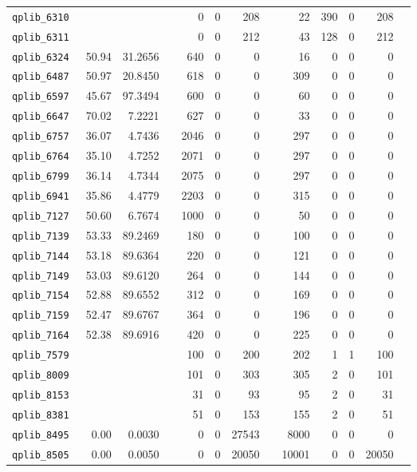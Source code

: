 \begin{longtable}{lrrrrrrrrrrrr}
{\tt 	qplib\_6310	}	&		&		&	&	0	&	0	&	208	&	&	22	&	390	&	0	&	208	\\
{\tt 	qplib\_6311	}	&		&		&	&	0	&	0	&	212	&	&	43	&	128	&	0	&	212	\\
{\tt 	qplib\_6324	}	&	50.94	&	31.2656	&	&	640	&	0	&	0	&	&	16	&	0	&	0	&	0	\\
{\tt 	qplib\_6487	}	&	50.97	&	20.8450	&	&	618	&	0	&	0	&	&	309	&	0	&	0	&	0	\\
{\tt 	qplib\_6597	}	&	45.67	&	97.3494	&	&	600	&	0	&	0	&	&	60	&	0	&	0	&	0	\\
{\tt 	qplib\_6647	}	&	70.02	&	7.2221	&	&	627	&	0	&	0	&	&	33	&	0	&	0	&	0	\\
{\tt 	qplib\_6757	}	&	36.07	&	4.7436	&	&	2046	&	0	&	0	&	&	297	&	0	&	0	&	0	\\
{\tt 	qplib\_6764	}	&	35.10	&	4.7252	&	&	2071	&	0	&	0	&	&	297	&	0	&	0	&	0	\\
{\tt 	qplib\_6799	}	&	36.14	&	4.7344	&	&	2075	&	0	&	0	&	&	297	&	0	&	0	&	0	\\
{\tt 	qplib\_6941	}	&	35.86	&	4.4779	&	&	2203	&	0	&	0	&	&	315	&	0	&	0	&	0	\\
{\tt 	qplib\_7127	}	&	50.60	&	6.7674	&	&	1000	&	0	&	0	&	&	50	&	0	&	0	&	0	\\
{\tt 	qplib\_7139	}	&	53.33	&	89.2469	&	&	180	&	0	&	0	&	&	100	&	0	&	0	&	0	\\
{\tt 	qplib\_7144	}	&	53.18	&	89.6364	&	&	220	&	0	&	0	&	&	121	&	0	&	0	&	0	\\
{\tt 	qplib\_7149	}	&	53.03	&	89.6120	&	&	264	&	0	&	0	&	&	144	&	0	&	0	&	0	\\
{\tt 	qplib\_7154	}	&	52.88	&	89.6552	&	&	312	&	0	&	0	&	&	169	&	0	&	0	&	0	\\
{\tt 	qplib\_7159	}	&	52.47	&	89.6767	&	&	364	&	0	&	0	&	&	196	&	0	&	0	&	0	\\
{\tt 	qplib\_7164	}	&	52.38	&	89.6916	&	&	420	&	0	&	0	&	&	225	&	0	&	0	&	0	\\
{\tt 	qplib\_7579	}	&		&		&	&	100	&	0	&	200	&	&	202	&	1	&	1	&	100	\\
{\tt 	qplib\_8009	}	&		&		&	&	101	&	0	&	303	&	&	305	&	2	&	0	&	101	\\
{\tt 	qplib\_8153	}	&		&		&	&	31	&	0	&	93	&	&	95	&	2	&	0	&	31	\\
{\tt 	qplib\_8381	}	&		&		&	&	51	&	0	&	153	&	&	155	&	2	&	0	&	51	\\
{\tt 	qplib\_8495	}	&	0.00	&	0.0030	&	&	0	&	0	&	27543	&	&	8000	&	0	&	0	&	0	\\
{\tt 	qplib\_8505	}	&	0.00	&	0.0050	&	&	0	&	0	&	20050	&	&	10001	&	0	&	0	&	20050	\\

\end{longtable}
